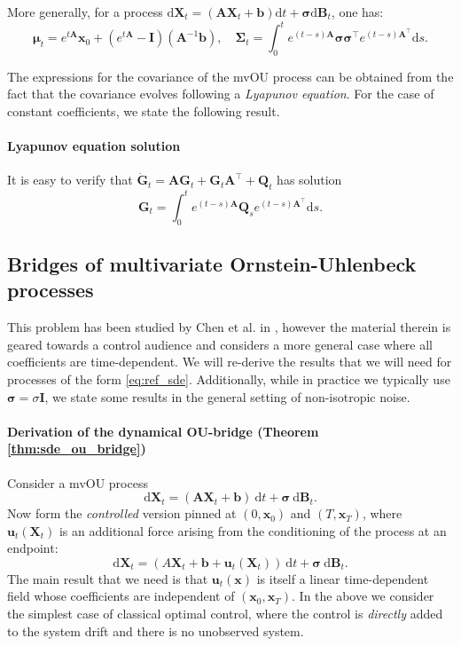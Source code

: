 \documentclass{article}
\newcommand{\diff}{\mathrm{d}}
\newcommand{\Id}{\mathbf{I}}
\theoremstyle{newstyle}
\begin{document}
More generally, for a process $\diff \bm{X}_t = (\bm{A} \bm{X}_t + \bm{b}) \diff t + \bm{\sigma} \diff \bm{B}_t$, one has:
\begin{equation}
  \bm{\mu}_t = e^{t\bm{A}} \bm{x}_0 + (e^{t\bm{A}} - \Id) (\bm{A}^{-1} \bm{b}), \quad \bm{\Sigma}_t = \int_0^t e^{(t-s) \bm{A}} \bm{\sigma} \bm{\sigma}^\top e^{(t-s) \bm{A}^\top} \diff s. 
\end{equation}

The expressions for the covariance of the mvOU process can be obtained from the fact that the covariance evolves following a \emph{Lyapunov equation}. For the case of constant coefficients, we state the following result.

\paragraph{Lyapunov equation solution}

It is easy to verify that $\dot{\bm{G}}_t = \bm{A} \bm{G}_t + \bm{G}_t \bm{A}^\top + \bm{Q}_t$ has solution
\[
  \bm{G}_t = \int_0^t e^{(t-s) \bm{A}} \bm{Q}_s e^{(t-s) \bm{A}^\top} \diff s.
\]


\subsection{Bridges of multivariate Ornstein-Uhlenbeck processes}\label{sec:appendix_bridges_mvOU}

This problem has been studied by Chen et al. in \cite{chen2015stochastic}, however the material therein is geared towards a control audience and considers a more general case where all coefficients are time-dependent. We will re-derive the results that we will need for processes of the form \eqref{eq:ref_sde}. Additionally, while in practice we typically use $\bm{\sigma} = \sigma \Id$, we state some results in the general setting of non-isotropic noise. 

\paragraph{Derivation of the dynamical OU-bridge (Theorem \ref{thm:sde_ou_bridge})}
Consider a mvOU process
\begin{equation}
  \diff \bm{X}_t = (\bm{A} \bm{X}_t + \bm{b}) \: \diff t + \bm{\sigma} \: \diff \bm{B}_t.  \label{eq:mvOU_sde_uncontrolled}
\end{equation}
Now form the \emph{controlled} version pinned at $(0, \bm{x}_0)$ and $(T, \bm{x}_T)$, where $\bm{u}_t(\bm{X}_t)$ is an additional force arising from the conditioning of the process at an endpoint:
\begin{equation}
  \diff \bm{X}_t = (A \bm{X}_t + \bm{b} + \bm{u}_t(\bm{X}_t) ) \: \diff t + \bm{\sigma} \: \diff \bm{B}_t. \label{eq:mvOU_sde_controlled} 
\end{equation}
The main result that we need is that $\bm{u}_t(\bm{x})$ is itself a linear time-dependent field whose coefficients are independent of $(\bm{x}_0, \bm{x}_T)$. 
In the above we consider the simplest case of classical optimal control, where the control is \emph{directly} added to the system drift and there is no unobserved system.
\end{document}
